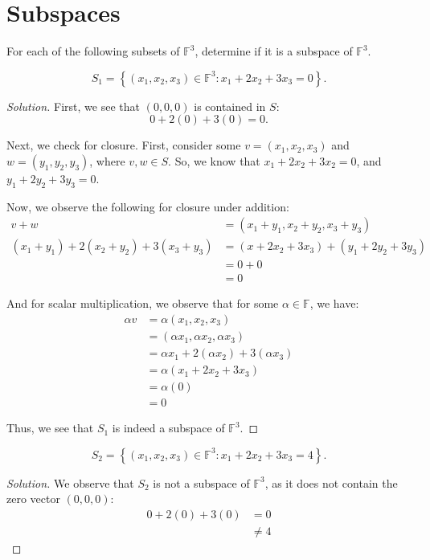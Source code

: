 \documentclass[openany]{book}
\newenvironment{solution}{\begin{proof}[Solution]}{\end{proof}}
\begin{document}
	\section{Subspaces}
	For each of the following subsets of $\mathbb{F}^{3}$, determine if it is a subspace of $\mathbb{F}^{3}$.
	\begin{hw}
		\begin{equation*}
			S_{1} = \left\{  (x_{1}, x_{2}, x_{3}) \in \mathbb{F}^{3} : x_{1} + 2x_{2} + 3x_{3} = 0\right\}.
		\end{equation*}
	\end{hw}
	\begin{solution}
		First, we see that $(0,0,0)$ is contained in $S$:
		\begin{equation*}
			0 + 2(0) + 3(0) = 0.
		\end{equation*}
	
		Next, we check for closure. First, consider some $v = (x_{1}, x_{2}, x_{3})$ and $w = (y_{1}, y_{2}, y_{3})$, where $v, w \in S$. So, we know that $x_{1} + 2x_{2} + 3x_{2} = 0$, and $y_{1} + 2y_{2} + 3y_{3} = 0$.
		
		Now, we observe the following for closure under addition:
		\begin{align*}
			v + w &= (x_{1} + y_{1}, x_{2} + y_{2}, x_{3} + y_{3}) \\
			(x_{1} + y_{1}) + 2(x_{2} + y_{2}) + 3(x_{3} + y_{3}) &= (x + 2x_{2} + 3x_{3}) + (y_{1} + 2y_{2} + 3y_{3}) \\
			&= 0 + 0 \\
			&= 0
		\end{align*}
	
		And for scalar multiplication, we observe that for some $\alpha \in \mathbb{F}$, we have:
		\begin{align*}
			\alpha v &= \alpha(x_{1}, x_{2}, x_{3}) \\ 
			&= (\alpha x_{1}, \alpha x_{2}, \alpha x_{3}) \\
			&= \alpha x_{1} + 2(\alpha x_{2}) + 3(\alpha x_{3}) \\
			&= \alpha(x_{1} + 2x_{2} + 3x_{3}) \\
			&= \alpha (0) \\
			&= 0
		\end{align*}
	
		Thus, we see that $S_{1}$ is indeed a subspace of $\mathbb{F}^{3}$.
	\end{solution}

	\begin{hw}
		\begin{equation*}
			S_{2} = \left\{  (x_{1}, x_{2}, x_{3}) \in \mathbb{F}^{3} : x_{1} + 2x_{2} + 3x_{3} = 4 \right\}.
		\end{equation*}
	\end{hw}
	\begin{solution}
		We observe that $S_{2}$ is not a subspace of $\mathbb{F}^{3}$, as it does not contain the zero vector $(0,0,0)$:
		\begin{align*}
			0 + 2(0) + 3(0) &= 0 \\
			&\neq 4
		\end{align*}
	\end{solution}
\end{document}

